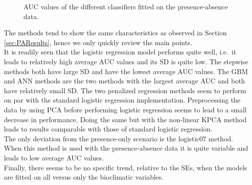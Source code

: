 \begin{figure}[!htb]
\center
{}
\caption{\label{fig:PrAbAUC}AUC values of the different classifiers fitted on the presence-absence data.}
\end{figure}

The methods tend to show the same characteristics as observed in Section \ref{sec:PAResults}, hence we only quickly review the main points. \\


It is readily seen that the logistic regression model performs quite well, i.e.\ it leads to relatively high average AUC values and its SD is quite low. The stepwise methods both have large SD and have the lowest average AUC values. The GBM and ANN methods are the two methods with the largest average AUC and both have relatively small SD. The two penalized regression methods seem to perform on par with the standard logistic regression implementation. Preprocessing the data by using PCA before performing logistic regression seems to lead to a small decrease in performance. Doing the same but with the non-linear KPCA method leads to results comparable with those of standard logistic regression. \\

The only deviation from the presence-only scenario is the logistic07 method. When this method is used with the presence-absence data it is quite variable and leads to low average AUC values. \\

Finally, there seems to be no specific trend, relative to the SEs, when the models are fitted on all versus only the bioclimatic variables. 




